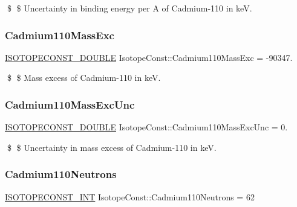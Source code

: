 \$ \$ Uncertainty in binding energy per A of Cadmium-\/110 in keV. \mbox{\label{group___isotope_const-_cadmium-_cd110_gaf4acddbfea974a312ed8d256e13d7472}} 
\subsubsection{\texorpdfstring{Cadmium110\+Mass\+Exc}{Cadmium110MassExc}}
{\footnotesize\ttfamily \mbox{\hyperlink{group___isotope_const-_macros_ga8f45a7272ce02c0b4c65c44636ed719a}{I\+S\+O\+T\+O\+P\+E\+C\+O\+N\+S\+T\+\_\+\+D\+O\+U\+B\+LE}} Isotope\+Const\+::\+Cadmium110\+Mass\+Exc = -\/90347.}

\$ \$ Mass excess of Cadmium-\/110 in keV. \mbox{\label{group___isotope_const-_cadmium-_cd110_ga0370034ef7162074eab1191fd308211d}} 
\subsubsection{\texorpdfstring{Cadmium110\+Mass\+Exc\+Unc}{Cadmium110MassExcUnc}}
{\footnotesize\ttfamily \mbox{\hyperlink{group___isotope_const-_macros_ga8f45a7272ce02c0b4c65c44636ed719a}{I\+S\+O\+T\+O\+P\+E\+C\+O\+N\+S\+T\+\_\+\+D\+O\+U\+B\+LE}} Isotope\+Const\+::\+Cadmium110\+Mass\+Exc\+Unc = 0.}

\$ \$ Uncertainty in mass excess of Cadmium-\/110 in keV. \mbox{\label{group___isotope_const-_cadmium-_cd110_gab95ae0414c1f4ae6f20dd9e92b053940}} 
\subsubsection{\texorpdfstring{Cadmium110\+Neutrons}{Cadmium110Neutrons}}
{\footnotesize\ttfamily \mbox{\hyperlink{group___isotope_const-_macros_ga5f18360b3e99483a35c32d789e62621c}{I\+S\+O\+T\+O\+P\+E\+C\+O\+N\+S\+T\+\_\+\+I\+NT}} Isotope\+Const\+::\+Cadmium110\+Neutrons = 62}

